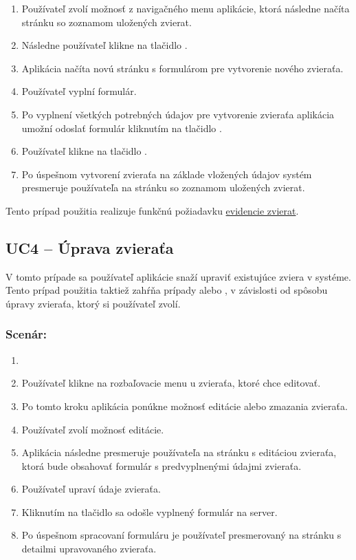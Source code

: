 \begin{enumerate}
	\item Používateľ zvolí možnosť  z navigačného menu aplikácie, ktorá následne načíta stránku so zoznamom uložených zvierat.
	\item Následne používateľ klikne na tlačidlo .
	\item Aplikácia načíta novú stránku s formulárom pre vytvorenie nového zvieraťa.
	\item Používateľ vyplní formulár.
	\item Po vyplnení všetkých potrebných údajov pre vytvorenie zvieraťa aplikácia umožní odoslať formulár kliknutím na tlačidlo .
	\item Používateľ klikne na tlačidlo .
	\item Po úspešnom vytvorení zvieraťa na základe vložených údajov systém presmeruje používateľa na stránku so zoznamom uložených zvierat.
\end{enumerate}

Tento prípad použitia realizuje funkčnú požiadavku \hyperref[evidencia-zvierat]{evidencie zvierat}.

\subsection*{UC4 -- Úprava zvieraťa}

V tomto prípade sa používateľ aplikácie snaží upraviť existujúce zviera v systéme. Tento prípad použitia taktiež zahŕňa prípady 
 alebo , v závislosti od spôsobu úpravy zvieraťa, ktorý si používateľ zvolí.

\subsubsection*{Scenár:}

\begin{enumerate}
	\item {}
	\item Používateľ klikne na rozbaľovacie menu u zvieraťa, ktoré chce editovať.
	\item Po tomto kroku aplikácia ponúkne možnosť editácie alebo zmazania zvieraťa.
	\item Používateľ zvolí možnosť editácie.
	\item Aplikácia následne presmeruje používateľa na stránku s editáciou zvieraťa, ktorá bude obsahovať formulár s predvyplnenými údajmi zvieraťa.
	\item Používateľ upraví údaje zvieraťa.
	\item Kliknutím na tlačidlo  sa odošle vyplnený formulár na server.
	\item Po úspešnom spracovaní formuláru je používateľ presmerovaný na stránku s detailmi upravovaného zvieraťa.
\end{enumerate}

